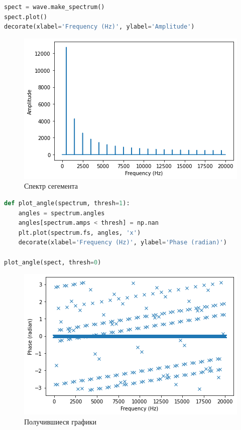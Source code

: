 \begin{lstlisting}[language=Python]
spect = wave.make_spectrum()
spect.plot()
decorate(xlabel='Frequency (Hz)', ylabel='Amplitude')
\end{lstlisting}

\begin{figure}[H]
	\begin{center}
		\includegraphics[scale=1]{fig/lab06/lab06_08.png}
		\caption{Спектр сегемента}
	\end{center}
\end{figure}

\begin{lstlisting}[language=Python]
def plot_angle(spectrum, thresh=1):
    angles = spectrum.angles
    angles[spectrum.amps < thresh] = np.nan
    plt.plot(spectrum.fs, angles, 'x')
    decorate(xlabel='Frequency (Hz)', ylabel='Phase (radian)')
    
plot_angle(spect, thresh=0)
\end{lstlisting}

\begin{figure}[H]
	\begin{center}
		\includegraphics[scale=0.66]{fig/lab06/lab06_09.png}
		\caption{Получившиеся графики}
	\end{center}
\end{figure}

